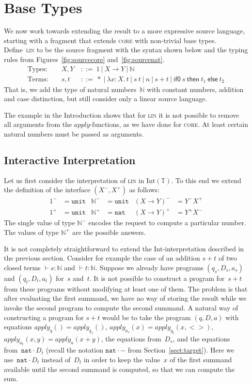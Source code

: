 \documentclass{LMCS}
\theoremstyle{definition}
\theoremstyle{plain}
\newcommand{\lollipop}{\to}
\newcommand{\kw}[1]{\mathsf{#1}}
\newcommand{\NN}{\mathbb{N}}
\newcommand{\unit}{\mathtt{unit}}
\newcommand{\VN}{\mathtt{nat}}
\newcommand{\Capply}{\textit{apply}}
\newcommand{\Mid}{\ \mathrel{\big|} \ }
\newcommand{\SeqTm}[3]{#1 \vdash #2 \colon #3}
\newcommand{\tlami}[3]{\lambda {#1}{:}{#2}.\, {#3}}
\newcommand{\tif}[3]{\kw{if0}\ #1\ \kw{then}\ #2\ \kw{else}\ #3}
\newcommand{\TT}{\mathbb{T}}
\newcommand{\Int}[1]{\textrm{Int}(#1)}
\begin{document}
\section{Base Types}
\label{sect:base}

We now work towards extending the result to a more expressive 
source language, starting with a fragment that extends \textsc{core} 
with non-trivial base types.
Define~\textsc{lin} to be the source fragment with
the syntax shown below and the 
typing rules from Figures~\ref{fig:sourcecore}
and~\ref{fig:sourcenat}.
\begin{align*}
  \text{Types: } && 
  X, Y &\ ::=\  1  \Mid X \to Y \Mid \NN  \\
  \text{Terms: } && s, t  &\ ::=\  * 
  \Mid \tlami x X t \Mid s\ t 
  \Mid n \Mid s+t 
  \Mid \tif s {t_1} {t_2}
\end{align*}
That is, we add the type of natural numbers~$\NN$ with
constant numbers, addition and case distinction,
but still consider only a linear source language.

The example in the Introduction shows that for \textsc{lin}
it is not possible to remove all arguments 
from the $\Capply$-functions, as we have done for \textsc{core}. 
At least certain natural numbers must be
passed as arguments.

\subsection{Interactive Interpretation}
Let us first consider the interpretation of \textsc{lin} in $\Int\TT$.
To this end we extend the definition of the interface $(X^-, X^+)$ as follows:
\begin{align*}
  1^- &= \unit
  &
  \NN^- &= \unit
  &
  (X \lollipop Y)^- &= Y^- X^+
  \\
  1^+ &= \unit
  &
  \NN^+ &= \VN
  &
  (X \lollipop Y)^+ &= Y^+ X^-
\end{align*}
The single value of type $\NN^-$ encodes the request 
to compute a particular number. 
The values of type $\NN^+$ are the possible answers.

It is not completely straightforward to extend the 
Int-interpretation described in the previous section.
Consider for example 
the case of an addition $s+t$ of two closed terms $\SeqTm{}{s}{\NN}$ and $\SeqTm{}{t}{\NN}$.
Suppose we already have programs $(q_s, D_s, a_s)$ and
$(q_t, D_t, a_t)$ for~$s$ and~$t$.
It is not possible to construct a program for~$s+t$ from these 
programs without modifying at least one of them. The problem is that after
evaluating the first summand, we have no way of storing the result while we invoke the
second program to compute the second summand.
A natural way of constructing a program for $s+t$ would be to take
the program $(q,D,a)$ with equations
$\Capply_q() = \Capply_{q_s}()$,
$\Capply_{a_s}(x) = \Capply_{q_t}(x,<>)$,
$\Capply_{a_t}(x,y) = \Capply_a(x+y)$,
the equations from~$D_s$, and the equations from~$\VN\cdot D_t$
(recall the notation $\VN\cdot -$ from Section~\ref{sect:target}).
Here we use~$\VN\cdot D_t$ instead of~$D_t$ 
in order to keep the value~$x$ of the first summand available until the 
second summand is computed, so that we can compute the sum.
\end{document}
